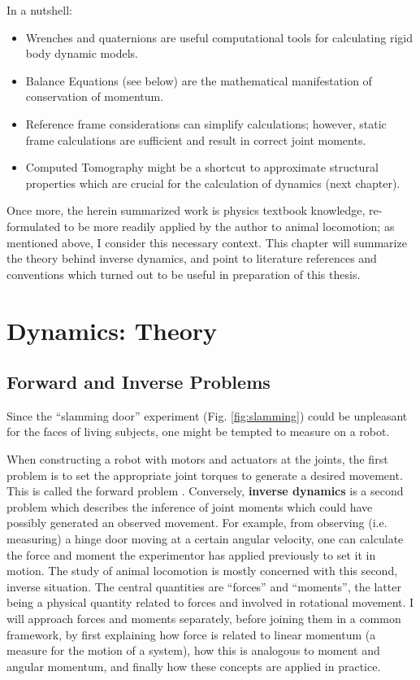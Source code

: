 \documentclass[10pt,a4paper]{article}
\begin{document}
In a nutshell:
\begin{itemize}
\item Wrenches and quaternions are useful computational tools for calculating rigid body dynamic models.
\item Balance Equations (see below) are the mathematical manifestation of conservation of momentum.
\item Reference frame considerations can simplify calculations; however, static frame calculations are sufficient and result in correct joint moments.
\end{itemize}

\begin{itemize}
\item Computed Tomography might be a shortcut to approximate structural properties which are crucial for the calculation of dynamics (next chapter).
\end{itemize}


Once more, the herein summarized work is physics textbook knowledge, re-formulated to be more readily applied by the author to animal locomotion; as mentioned above, I consider this necessary context.
This chapter will summarize the theory behind inverse dynamics, and point to literature references and conventions which turned out to be useful in preparation of this thesis.


\section{Dynamics: Theory}
\label{sec:org8cc9a44}
\subsection{Forward and Inverse Problems}
\label{sec:org0e6a712}
Since the ``slamming door'' experiment (Fig. \ref{fig:slamming}) could be unpleasant for the faces of living subjects, one might be tempted to measure on a robot.

When constructing a robot with motors and actuators at the joints, the first problem is to set the appropriate joint torques to generate a desired movement.
This is called the forward problem \citep{Lynch2017}.
Conversely, \textbf{inverse dynamics} is a second problem which describes the inference of joint moments which could have possibly generated an observed movement.
For example, from observing (i.e. measuring) a hinge door moving at a certain angular velocity, one can calculate the force and moment the experimentor has applied previously to set it in motion.
The study of animal locomotion is mostly concerned with this second, inverse situation.
The central quantities are ``forces'' and ``moments'', the latter being a physical quantity related to forces and involved in rotational movement.
I will approach forces and moments separately, before joining them in a common framework, by first explaining how force is related to linear momentum (a measure for the motion of a system), how this is analogous to moment and angular momentum, and finally how these concepts are applied in practice.
\end{document}
